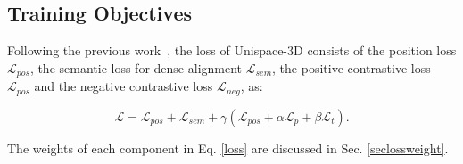 \documentclass[lettersize,journal]{IEEEtran}
\begin{document}

\subsection{Training Objectives}
\label{sec35}
Following the previous work~\cite{eda}, the loss of Unispace-3D consists of the position loss $\mathcal{L}_{pos}$, the semantic loss for dense alignment $\mathcal{L}_{sem}$, the positive contrastive loss $\mathcal{L}_{pos}$ and the negative contrastive loss $\mathcal{L}_{neg}$, as:

\begin{equation}
\mathcal{L}= \mathcal{L}_{pos} + \mathcal{L}_{sem} + \gamma \left(\mathcal{L}_{pos} + \alpha \mathcal{L}_{p} + \beta \mathcal{L}_{t} \right).
\label{loss}
\end{equation}

The weights of each component in Eq.
\textcolor{red}{\ref{loss}} 
are discussed in Sec. 
\textcolor{red}{\ref{seclossweight}}.
\end{document}
